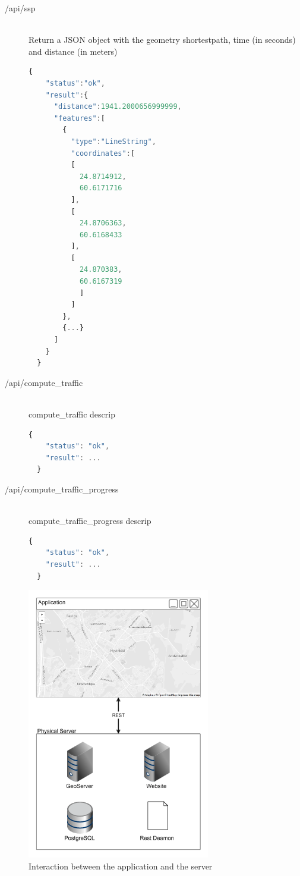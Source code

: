 \begin{description}
  \item[/api/ssp] \hfill \\ 
    Return a JSON object with the geometry shortestpath, 
    time (in seconds) and distance (in meters) \\
    \begin{lstlisting}[language=javascript]
  {
    "status":"ok",
    "result":{
      "distance":1941.2000656999999,
      "features":[
        {
          "type":"LineString",
          "coordinates":[
          [
            24.8714912,
            60.6171716
          ],
          [
            24.8706363,
            60.6168433
          ],
          [
            24.870383,
            60.6167319
            ]
          ]
        },
        {...}
      ]
    }
  }
    \end{lstlisting}
  \item[/api/compute\_traffic] \hfill \\ 
    compute\_traffic descrip \\
    \begin{lstlisting}[language=javascript]
  {
    "status": "ok",
    "result": ...
  }
    \end{lstlisting}
  \item[/api/compute\_traffic\_progress] \hfill \\ 
    compute\_traffic\_progress descrip \\
    \begin{lstlisting}[language=javascript]
  {
    "status": "ok",
    "result": ...
  }
    \end{lstlisting}
  
\end{description}

\begin{figure}[h]
  \centering
  \includegraphics[width=8cm]{img/c02-application/png/app-server-interact.png}
  \caption{Interaction between the application and the server}
\end{figure}


